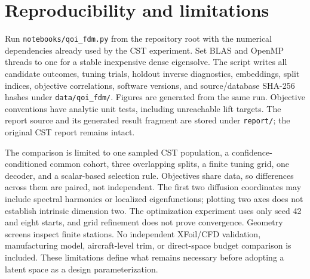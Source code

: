 \documentclass[11pt,a4paper]{article}
\begin{document}
\section{Reproducibility and limitations}
Run \texttt{notebooks/qoi\_fdm.py} from the repository root with the numerical dependencies already used by the CST experiment. Set BLAS and OpenMP threads to one for a stable inexpensive dense eigensolve. The script writes all candidate outcomes, tuning trials, holdout inverse diagnostics, embeddings, split indices, objective correlations, software versions, and source/database SHA-256 hashes under \texttt{data/qoi\_fdm/}. Figures are generated from the same run. Objective conventions have analytic unit tests, including unreachable lift targets. The report source and its generated result fragment are stored under \texttt{report/}; the original CST report remains intact.

The comparison is limited to one sampled CST population, a confidence-conditioned common cohort, three overlapping splits, a finite tuning grid, one decoder, and a scalar-based selection rule. Objectives share data, so differences across them are paired, not independent. The first two diffusion coordinates may include spectral harmonics or localized eigenfunctions; plotting two axes does not establish intrinsic dimension two. The optimization experiment uses only seed 42 and eight starts, and grid refinement does not prove convergence. Geometry screens inspect finite stations. No independent XFoil/CFD validation, manufacturing model, aircraft-level trim, or direct-space budget comparison is included. These limitations define what remains necessary before adopting a latent space as a design parameterization.


\end{document}
